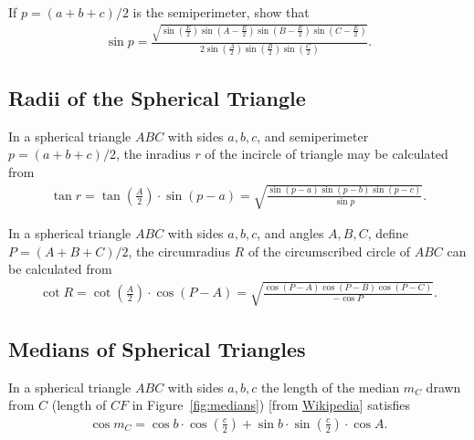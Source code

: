 \documentclass[12pt,a4paper]{memoir}
\theoremstyle{definition}
\begin{document}
	
	\begin{question}
		If $p=(a+b+c)/2$ is the semiperimeter, show that
		\begin{align*}
			\sin p = \frac{\displaystyle \sqrt{\sin\left(\frac{E}{2}\right)\sin\left(A-\frac{E}{2}\right)\sin\left(B-\frac{E}{2}\right)\sin\left(C-\frac{E}{2}\right)}}{\displaystyle 2\sin\left(\frac{A}{2}\right)\sin\left(\frac{B}{2}\right)\sin\left(\frac{C}{2}\right)}.
		\end{align*}
	\end{question}
	
	
\subsection{Radii of the Spherical Triangle}


	\begin{question}[name={Inradius of the Spherical Triangle}]
		In a spherical triangle $ABC$ with sides $a,b,c$, and semiperimeter $p=(a+b+c)/2$, the inradius $r$ of the incircle of triangle may be calculated from
		\begin{align*}
			\tan r = \tan\left(\frac{A}{2}\right)\cdot \sin(p-a) = \sqrt{\frac{\sin(p-a)\sin(p-b)\sin(p-c)}{\sin p}}.
		\end{align*}
	\end{question}
	\begin{question}[name={Circumradius of the Spherical Triangle}]
		In a spherical triangle $ABC$ with sides $a,b,c$, and angles $A,B,C$, define $P=(A+B+C)/2$, the circumradius $R$ of the circumscribed circle of $ABC$ can be calculated from
		\begin{align*}
			\cot R = \cot\left(\frac{A}{2}\right)\cdot \cos(P-A) = \sqrt{\frac{\cos(P-A)\cos(P-B)\cos(P-C)}{-\cos P}}.
		\end{align*}
	\end{question}


\subsection{Medians of Spherical Triangles}

	\begin{question}
		In a spherical triangle $ABC$ with sides $a,b,c$ the length of the median $m_C$ drawn from $C$ (length of $CF$ in Figure~\ref{fig:medians}) [from \href{https://commons.wikimedia.org/wiki/File:Spherical_medians.svg}{Wikipedia}] satisfies
		\begin{align*}
			\cos m_{C}=\cos b\cdot \cos\left( {\frac {c}{2}}\right)+\sin b\cdot \sin\left({\frac {c}{2}}\right)\cdot \cos A. 
		\end{align*}
	\end{question}
	
\end{document}
